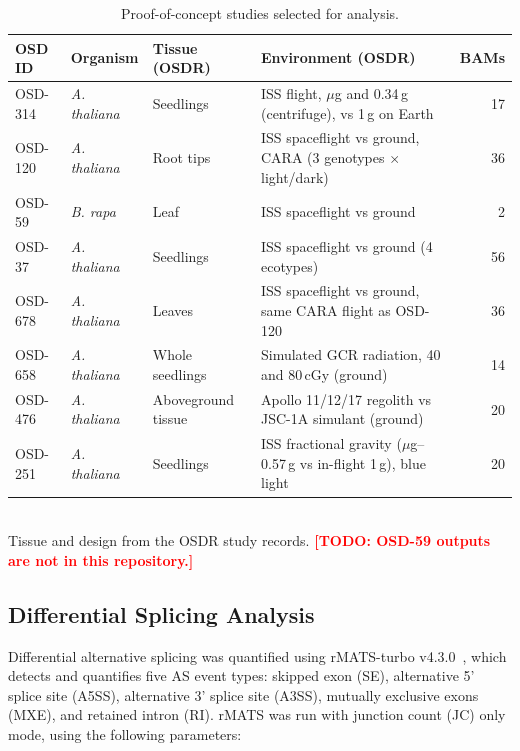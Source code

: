 \documentclass[12pt,a4paper]{article}
\newcommand{\TODO}[1]{\textcolor{red}{\textbf{[TODO: #1]}}}
\begin{document}
\begin{table}[h]
\centering
\caption{Proof-of-concept studies selected for analysis.}
\label{tab:studies}
\begin{tabularx}{\textwidth}{lllXr}
\toprule
\textbf{OSD ID} & \textbf{Organism} & \textbf{Tissue (OSDR)} & \textbf{Environment (OSDR)} & \textbf{BAMs} \\
\midrule
OSD-314 & \textit{A. thaliana} & Seedlings & ISS flight, $\mu$g and 0.34\,g (centrifuge), vs 1\,g on Earth & 17 \\
OSD-120 & \textit{A. thaliana} & Root tips & ISS spaceflight vs ground, CARA (3 genotypes $\times$ light/dark) & 36 \\
OSD-59 & \textit{B. rapa} & Leaf & ISS spaceflight vs ground & 2 \\
OSD-37 & \textit{A. thaliana} & Seedlings & ISS spaceflight vs ground (4 ecotypes) & 56 \\
OSD-678 & \textit{A. thaliana} & Leaves & ISS spaceflight vs ground, same CARA flight as OSD-120 & 36 \\
OSD-658 & \textit{A. thaliana} & Whole seedlings & Simulated GCR radiation, 40 and 80\,cGy (ground) & 14 \\
OSD-476 & \textit{A. thaliana} & Aboveground tissue & Apollo 11/12/17 regolith vs JSC-1A simulant (ground) & 20 \\
OSD-251 & \textit{A. thaliana} & Seedlings & ISS fractional gravity ($\mu$g--0.57\,g vs in-flight 1\,g), blue light & 20 \\
\bottomrule
\end{tabularx}
\\[2pt]
\footnotesize{Tissue and design from the OSDR study records. \TODO{OSD-59 outputs are not in this repository.}}
\end{table}

\subsection{Differential Splicing Analysis}

Differential alternative splicing was quantified using rMATS-turbo v4.3.0~\cite{rmats_turbo}, which detects and quantifies five AS event types: skipped exon (SE), alternative 5' splice site (A5SS), alternative 3' splice site (A3SS), mutually exclusive exons (MXE), and retained intron (RI). rMATS was run with junction count (JC) only mode, using the following parameters:
\end{document}
